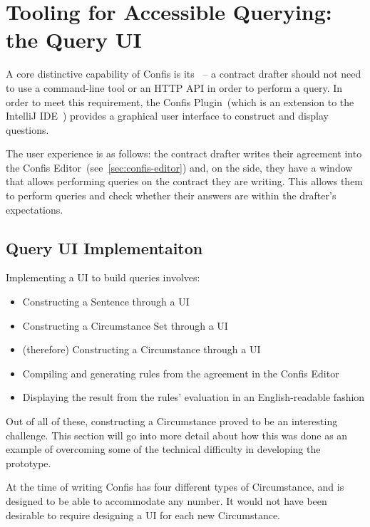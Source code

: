 

\section[Query UI]{Tooling for Accessible Querying: the Query UI}\label{sec:queryUI}

A core distinctive capability of Confis is its~ -- a contract drafter should not need to use a command-line tool or an HTTP API in order to perform a query.
In order to meet this requirement, the Confis Plugin~(which is an extension to the IntelliJ IDE~\cite{intelliJRepo, ideaExtensionPoints}) provides a graphical user interface to construct and display questions.

The user experience is as follows: the contract drafter writes their agreement into the Confis Editor~(see~\autoref{sec:confis-editor}) and, on the side, they have a window that allows performing queries on the contract they are writing.
This allows them to perform queries and check whether their answers are within the drafter's expectations.

\subsection{Query UI Implementaiton}\label{subsec:query-ui-implementaiton}

Implementing a UI to build queries involves:

\begin{itemize}
    \item Constructing a Sentence through a UI
    \item Constructing a Circumstance Set through a UI
    \item (therefore) Constructing a Circumstance through a UI
    \item Compiling and generating rules from the agreement in the Confis Editor
    \item Displaying the result from the rules' evaluation in an English-readable fashion
\end{itemize}

Out of all of these, constructing a Circumstance proved to be an interesting challenge.
This section will go into more detail about how this was done as an example of overcoming some of the technical difficulty in developing the prototype.

At the time of writing Confis has four different types of Circumstance, and is designed to be able to accommodate any number.
It would not have been desirable to require designing a UI for each new Circumstance.

